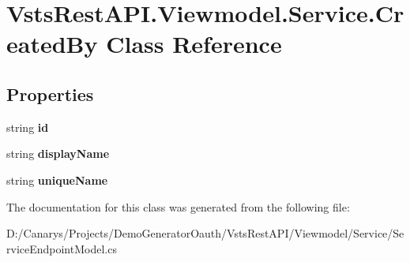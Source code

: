 \hypertarget{class_vsts_rest_a_p_i_1_1_viewmodel_1_1_service_1_1_created_by}{}\section{Vsts\+Rest\+A\+P\+I.\+Viewmodel.\+Service.\+Created\+By Class Reference}
\label{class_vsts_rest_a_p_i_1_1_viewmodel_1_1_service_1_1_created_by}
\subsection*{Properties}
\begin{DoxyCompactItemize}
\item 
\mbox{\label{class_vsts_rest_a_p_i_1_1_viewmodel_1_1_service_1_1_created_by_af08b09d975f3f929c55fad5b2ab24286}} 
string {\bfseries id}
\item 
\mbox{\label{class_vsts_rest_a_p_i_1_1_viewmodel_1_1_service_1_1_created_by_a3f588beb70f49c0a090e7745072a88ef}} 
string {\bfseries display\+Name}
\item 
\mbox{\label{class_vsts_rest_a_p_i_1_1_viewmodel_1_1_service_1_1_created_by_a14eaf9841de447efb614c7aadbc99d38}} 
string {\bfseries unique\+Name}
\end{DoxyCompactItemize}


The documentation for this class was generated from the following file\+:\begin{DoxyCompactItemize}
\item 
D\+:/\+Canarys/\+Projects/\+Demo\+Generator\+Oauth/\+Vsts\+Rest\+A\+P\+I/\+Viewmodel/\+Service/Service\+Endpoint\+Model.\+cs\end{DoxyCompactItemize}
